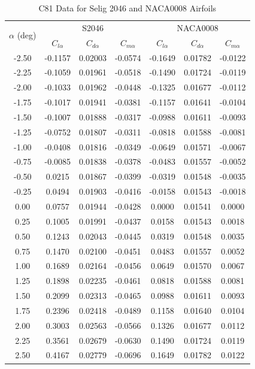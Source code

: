 \begin{table}[h]
\centering
\caption{C81 Data for Selig 2046 and NACA0008 Airfoils}
\label{tab:aero_coeffs}
\begin{tabular}{|c|c|c|c|c|c|c|}
\hline
\multirow{2}{*}{$\alpha$ (deg)} & \multicolumn{3}{c|}{S2046} & \multicolumn{3}{c|}{NACA0008} \\
\cline{2-7}
 & $C_{l\alpha}$ & $C_{d\alpha}$ & $C_{m\alpha}$ & $C_{l\alpha}$ & $C_{d\alpha}$ & $C_{m\alpha}$ \\
\hline
-2.50 & -0.1157 & 0.02003 & -0.0574 & -0.1649 & 0.01782 & -0.0122 \\
-2.25 & -0.1059 & 0.01961 & -0.0518 & -0.1490 & 0.01724 & -0.0119 \\
-2.00 & -0.1033 & 0.01962 & -0.0448 & -0.1325 & 0.01677 & -0.0112 \\
-1.75 & -0.1017 & 0.01941 & -0.0381 & -0.1157 & 0.01641 & -0.0104 \\
-1.50 & -0.1007 & 0.01888 & -0.0317 & -0.0988 & 0.01611 & -0.0093 \\
-1.25 & -0.0752 & 0.01807 & -0.0311 & -0.0818 & 0.01588 & -0.0081 \\
-1.00 & -0.0408 & 0.01816 & -0.0349 & -0.0649 & 0.01571 & -0.0067 \\
-0.75 & -0.0085 & 0.01838 & -0.0378 & -0.0483 & 0.01557 & -0.0052 \\
-0.50 & 0.0215 & 0.01867 & -0.0399 & -0.0319 & 0.01548 & -0.0035 \\
-0.25 & 0.0494 & 0.01903 & -0.0416 & -0.0158 & 0.01543 & -0.0018 \\
0.00 & 0.0757 & 0.01944 & -0.0428 & 0.0000 & 0.01541 & 0.0000 \\
0.25 & 0.1005 & 0.01991 & -0.0437 & 0.0158 & 0.01543 & 0.0018 \\
0.50 & 0.1243 & 0.02043 & -0.0445 & 0.0319 & 0.01548 & 0.0035 \\
0.75 & 0.1470 & 0.02100 & -0.0451 & 0.0483 & 0.01557 & 0.0052 \\
1.00 & 0.1689 & 0.02164 & -0.0456 & 0.0649 & 0.01570 & 0.0067 \\
1.25 & 0.1898 & 0.02235 & -0.0461 & 0.0818 & 0.01588 & 0.0081 \\
1.50 & 0.2099 & 0.02313 & -0.0465 & 0.0988 & 0.01611 & 0.0093 \\
1.75 & 0.2396 & 0.02418 & -0.0489 & 0.1158 & 0.01640 & 0.0104 \\
2.00 & 0.3003 & 0.02563 & -0.0566 & 0.1326 & 0.01677 & 0.0112 \\
2.25 & 0.3561 & 0.02679 & -0.0630 & 0.1490 & 0.01724 & 0.0119 \\
2.50 & 0.4167 & 0.02779 & -0.0696 & 0.1649 & 0.01782 & 0.0122 \\
\hline
\end{tabular}
\end{table}

